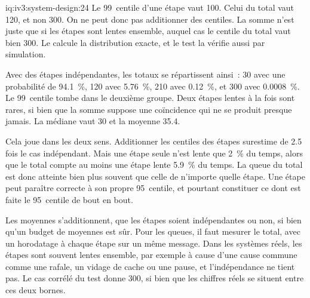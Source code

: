 \begin{solution}{iq:iv3:system-design:24}
Le 99~centile d'une étape vaut 100. Celui du total vaut 120, et non 300. On ne peut donc pas additionner des centiles. La somme n'est juste que si les étapes sont lentes ensemble, auquel cas le centile du total vaut bien 300. Le  calcule la distribution exacte, et le test la vérifie aussi par simulation.
\label{lst:iv3:sd:budget}

Avec des étapes indépendantes, les totaux se répartissent ainsi~: 30 avec une probabilité de 94.1~\%, 120 avec 5.76~\%, 210 avec 0.12~\%, et 300 avec 0.0008~\%. Le 99~centile tombe dans le deuxième groupe. Deux étapes lentes à la fois sont rares, si bien que la somme suppose une coïncidence qui ne se produit presque jamais. La médiane vaut 30 et la moyenne 35.4.

Cela joue dans les deux sens. Additionner les centiles des étapes surestime de 2.5 fois le cas indépendant. Mais une étape seule n'est lente que 2~\% du temps, alors que le total compte au moins une étape lente 5.9~\% du temps. La queue du total est donc atteinte bien plus souvent que celle de n'importe quelle étape. Une étape peut paraître correcte à son propre 95~centile, et pourtant constituer ce dont est faite le 95~centile de bout en bout.

Les moyennes s'additionnent, que les étapes soient indépendantes ou non, si bien qu'un budget de moyennes est sûr. Pour les queues, il faut mesurer le total, avec un horodatage à chaque étape sur un même message. Dans les systèmes réels, les étapes sont souvent lentes ensemble, par exemple à cause d'une cause commune comme une rafale, un vidage de cache ou une pause, et l'indépendance ne tient pas. Le cas corrélé du test donne 300, si bien que les chiffres réels se situent entre ces deux bornes.

\end{solution}

